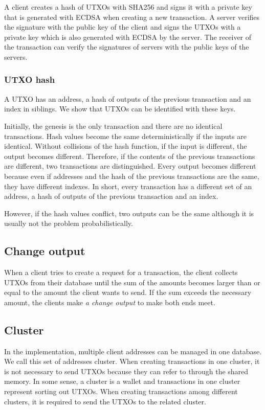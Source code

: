 \documentclass[a4paper, oneside]{discothesis}
\begin{document}
A client creates a hash of UTXOs with SHA256 and signs it with a private key
that is generated with ECDSA when creating a new transaction.
A server verifies the signature with the public key of the client
and signs the UTXOs with a private key which is also generated with ECDSA by the server.
The receiver of the transaction can verify the signatures of servers
with the public keys of the servers.

\subsubsection{UTXO hash}
A UTXO has an address, a hash of outputs of the previous transaction and an index in siblings.
We show that UTXOs can be identified with these keys.

Initially, the genesis is the only transaction and there are no identical transactions.
Hash values become the same deterministically if the inputs are identical.
Without collisions of the hash function, if the input is different, the output becomes different.
Therefore, if the contents of the previous transactions are different,
two transactions are distinguished.
Every output becomes different because even if addresses and the hash
of the previous transactions are the same, they have different indexes.
In short, every transaction has a different set of an address,
a hash of outputs of the previous transaction and an index.

However, if the hash values conflict, two outputs can be the same
although it is usually not the problem probabilistically.


\subsection{Change output}
When a client tries to create a request for a transaction,
the client collects UTXOs from their database until the sum of the amounts
becomes larger than or equal to the amount the client wants to send.
If the sum exceeds the necessary amount, the clients make \emph{a change output}
to make both ends meet.


\subsection{Cluster}
In the implementation, multiple client addresses can be managed in one database.
We call this set of addresses cluster.
When creating transactions in one cluster, it is not necessary to send UTXOs because they can refer to through the shared memory.
In some sense, a cluster is a wallet and transactions in one cluster represent sorting out UTXOs.
When creating transactions among different clusters, it is required to send the UTXOs to the related cluster.
\end{document}
